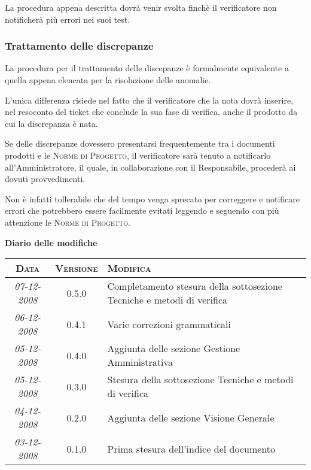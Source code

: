 \documentclass[11pt,a4paper]{article}
\newcommand{\modifiche} 
{
\newpage
\begin{center}
\textbf{Diario delle modifiche} \\
\bigskip
\begin{tabular}{|c|c|p{0.51\textwidth}|}
\hline
\textsc{Data} & \textsc{Versione} & \textsc{Modifica} \\
\hline
\hline
\textit{07-12-2008} & 0.5.0 & Completamento stesura della sottosezione Tecniche e metodi di verifica  \\
\hline
\textit{06-12-2008} & 0.4.1 & Varie correzioni grammaticali  \\
\hline
\textit{05-12-2008} & 0.4.0 & Aggiunta delle sezione Gestione Amministrativa  \\
\hline
\textit{05-12-2008} & 0.3.0 & Stesura della sottosezione Tecniche e metodi di verifica  \\
\hline
\textit{04-12-2008} & 0.2.0 & Aggiunta delle sezione Visione Generale  \\
\hline
\textit{03-12-2008} & 0.1.0 & Prima stesura dell'indice del documento \\
\hline
\end{tabular}
\end{center}
}
\begin{document}
La procedura appena descritta dovrà venir svolta finchè il verificatore non notificherà più errori nei suoi test.
\subsubsection{Trattamento delle discrepanze}
La procedura per il trattamento delle discepanze è formalmente equivalente a quella appena elencata per la risoluzione delle anomalie.

L'unica differenza risiede nel fatto che il verificatore che la nota dovrà inserire, nel resoconto del ticket che conclude la sua fase di verifica, anche il prodotto da cui la discrepanza è nata.

Se delle discrepanze dovessero presentarsi frequentemente tra i documenti prodotti e le \textsc{Norme di Progetto}, il verificatore sarà tenuto a notificarlo all'Amministratore, il quale, in collaborazione con il Responsabile, procederà ai dovuti provvedimenti.

Non è infatti tollerabile che del tempo venga sprecato per correggere e notificare errori che potrebbero essere facilmente evitati leggendo e seguendo con più attenzione le \textsc{Norme di Progetto}.

\modifiche
\end{document}
